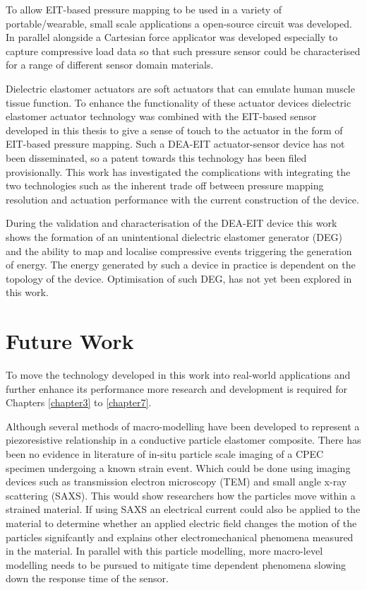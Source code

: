 To allow EIT-based pressure mapping to be used in a variety of portable/wearable, small scale applications a open-source circuit was developed. In parallel alongside a Cartesian force applicator was developed especially to capture compressive load data so that such pressure sensor could be characterised for a range of different sensor domain materials.

Dielectric elastomer actuators are soft actuators that can emulate human muscle tissue function. To enhance the functionality of these actuator devices dielectric elastomer actuator technology was combined with the EIT-based sensor developed in this thesis to give a sense of touch to the actuator in the form of EIT-based pressure mapping. Such a DEA-EIT actuator-sensor device has not been disseminated, so a patent towards this technology has been filed provisionally. This work has investigated the complications with integrating the two technologies such as the inherent trade off between pressure mapping resolution and actuation performance with the current construction of the device.

During the validation and characterisation of the DEA-EIT device this work shows the formation of an unintentional dielectric elastomer generator (DEG) and the ability to map and localise compressive events triggering the generation of energy. The energy generated by such a device in practice is dependent on the topology of the device. Optimisation of such DEG, has not yet been explored in this work.



\section{Future Work}
To move the technology developed in this work into real-world applications and further enhance its performance more research and development is required for Chapters \ref{chapter3} to \ref{chapter7}.

Although several methods of macro-modelling have been developed to represent a piezoresistive relationship in a conductive particle elastomer composite. There has been no evidence in literature of in-situ particle scale imaging of a CPEC specimen undergoing a known strain event. Which could be done using imaging devices such as transmission electron microscopy (TEM) and small angle x-ray scattering (SAXS). This would show researchers how the particles move within a strained material. If using SAXS an electrical current could also be applied to the material to determine whether an applied electric field changes the motion of the particles signifcantly and explains other electromechanical phenomena measured in the material. In parallel with this particle modelling, more macro-level modelling needs to be pursued to mitigate time dependent phenomena slowing down the response time of the sensor.

